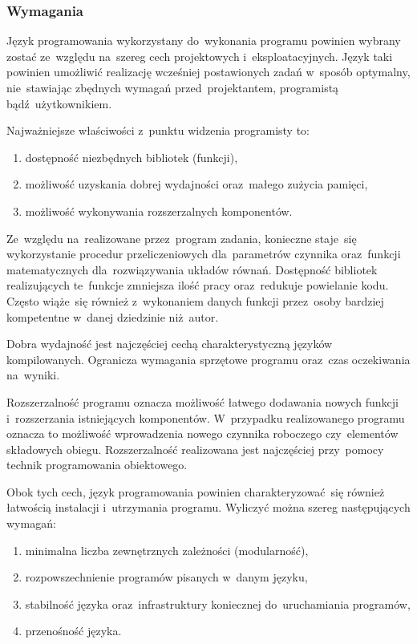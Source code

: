 \subsubsection{Wymagania}

Język programowania wykorzystany do~wykonania programu powinien wybrany
zostać ze~względu na~szereg cech projektowych i~eksploatacyjnych. Język
taki powinien umożliwić realizację wcześniej postawionych zadań w~sposób
optymalny, nie~stawiając zbędnych wymagań przed~projektantem,
programistą bądź~użytkownikiem.

Najważniejsze właściwości z~punktu widzenia programisty to:

\begin{enumerate}

	\item dostępność niezbędnych bibliotek (funkcji),

	\item możliwość uzyskania dobrej wydajności oraz~małego zużycia
	pamięci,

	\item możliwość wykonywania rozszerzalnych komponentów.

\end{enumerate}

Ze~względu na~realizowane przez~program zadania, konieczne staje~się
wykorzystanie procedur przeliczeniowych dla~parametrów czynnika
oraz~funkcji matematycznych dla~rozwiązywania układów równań. Dostępność
bibliotek realizujących te~funkcje zmniejsza ilość pracy oraz~redukuje
powielanie kodu. Często wiąże~się również z~wykonaniem danych funkcji
przez~osoby bardziej kompetentne w~danej dziedzinie niż~autor.

Dobra wydajność jest najczęściej cechą charakterystyczną języków
kompilowanych. Ogranicza wymagania sprzętowe programu oraz~czas
oczekiwania na~wyniki.

Rozszerzalność programu oznacza możliwość łatwego dodawania nowych
funkcji i~rozszerzania istniejących komponentów. W~przypadku
realizowanego programu oznacza to możliwość wprowadzenia nowego czynnika
roboczego czy~elementów składowych obiegu. Rozszerzalność realizowana
jest najczęściej przy~pomocy technik programowania obiektowego.

Obok tych cech, język programowania powinien charakteryzować~się również
łatwością instalacji i~utrzymania programu. Wyliczyć można szereg
następujących wymagań:

\begin{enumerate}

	\item minimalna liczba zewnętrznych zależności (modularność),

	\item rozpowszechnienie programów pisanych w~danym języku,

	\item stabilność języka oraz~infrastruktury koniecznej
	do~uruchamiania programów,

	\item przenośność języka.

\end{enumerate}

